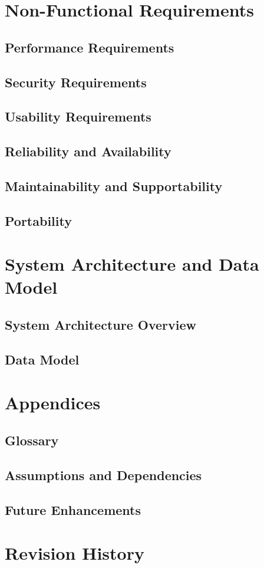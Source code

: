 \documentclass{scrreprt}
\begin{document}
\chapter{Non-Functional Requirements}

\section{Performance Requirements}
\section{Security Requirements}
\section{Usability Requirements}
\section{Reliability and Availability}
\section{Maintainability and Supportability}
\section{Portability}

\chapter{System Architecture and Data Model}

\section{System Architecture Overview}
\section{Data Model}

\chapter{Appendices}

\section{Glossary}
\section{Assumptions and Dependencies}
\section{Future Enhancements}

\chapter{Revision History}
\end{document}
